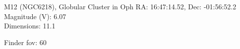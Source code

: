 \begin{block}{M12 (NGC6218), Globular Cluster in Oph}
    RA: 16:47:14.52, Dec: -01:56:52.2 \\ 
    Magnitude (V): 6.07 \\ 
    Dimensions: 11.1 

    Finder fov: 60 
\end{block}